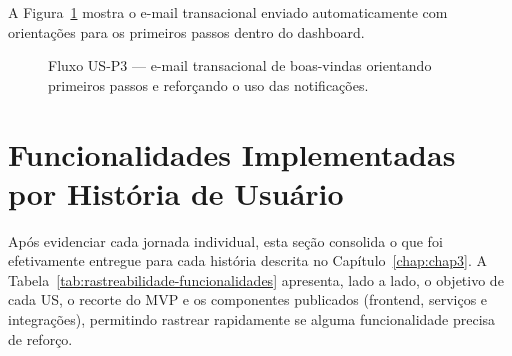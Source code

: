 A Figura~\ref{fig:us-p3} mostra o e-mail transacional enviado automaticamente com orientações para os primeiros passos dentro do dashboard.

\begin{figure}[!htbp]
\centering
{}
\caption{Fluxo US-P3 — e-mail transacional de boas-vindas orientando primeiros passos e reforçando o uso das notificações.}
\label{fig:us-p3}
\end{figure}

\FloatBarrier

\section{Funcionalidades Implementadas por História de Usuário}

Após evidenciar cada jornada individual, esta seção consolida o que foi efetivamente entregue para cada história descrita no Capítulo~\ref{chap:chap3}. A Tabela~\ref{tab:rastreabilidade-funcionalidades} apresenta, lado a lado, o objetivo de cada US, o recorte do MVP e os componentes publicados (frontend, serviços e integrações), permitindo rastrear rapidamente se alguma funcionalidade precisa de reforço.

